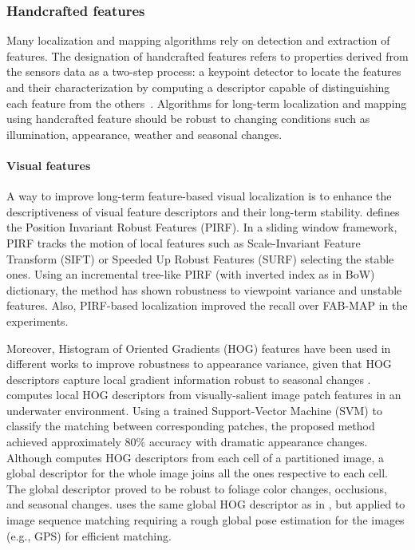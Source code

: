 \subsubsection{Handcrafted features}

Many localization and mapping algorithms rely on detection and extraction of features. The designation of handcrafted features refers to properties derived from the sensors data as a two-step process: a keypoint detector to locate the features and their characterization by computing a descriptor capable of distinguishing each feature from the others~\parencite{discussion:handcrafted-features}.
Algorithms for long-term localization and mapping using handcrafted feature should be robust to changing conditions such as illumination, appearance, weather and seasonal changes.

\paragraph{Visual features}

A way to improve long-term feature-based visual localization is to enhance the descriptiveness of visual feature descriptors and their long-term stability.
\cite{kawewong-et-al:2013:826410} defines the Position Invariant Robust Features (PIRF). In a sliding window framework, PIRF tracks the motion of local features such as Scale-Invariant Feature Transform (SIFT) or Speeded Up Robust Features (SURF) selecting the stable ones.
Using an incremental tree-like PIRF (with inverted index as in BoW) dictionary, the method has shown robustness to viewpoint variance and unstable features. Also, PIRF-based localization improved the recall over FAB-MAP in the experiments.

Moreover, Histogram of Oriented Gradients (HOG) features have been used in different works to improve robustness to appearance variance, given that HOG descriptors capture local gradient information robust to seasonal changes \parencite{naseer-et-al:2015:7324181}.
\cite{li-et-al:2015:7139706} computes local HOG descriptors from visually-salient image patch features in an underwater environment. Using a trained Support-Vector Machine (SVM) to classify the matching between corresponding patches, the proposed method achieved approximately 80\% accuracy with dramatic appearance changes.
Although \cite{naseer-et-al:2015:7324181} computes HOG descriptors from each cell of a partitioned image, a global descriptor for the whole image joins all the ones respective to each cell. The global descriptor proved to be robust to foliage color changes, occlusions, and seasonal changes.
\cite{vysotska-et-al:2015:7139576} uses the same global HOG descriptor as in \cite{naseer-et-al:2015:7324181}, but applied to image sequence matching requiring a rough global pose estimation for the images (e.g., GPS) for efficient matching.

